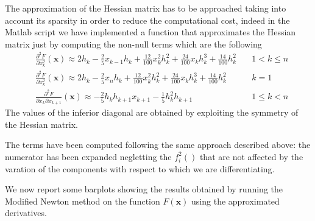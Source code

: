 The approximation of the Hessian matrix has to be approached taking into account its sparsity in order to reduce the computational cost, indeed in the Matlab script we have implemented a function that approximates the Hessian matrix just by computing the non-null terms which are the following
\begin{align*}
    & \frac{\partial^2 F}{\partial x_k^2} (\mathbf{x})  \approx 2h_k - \frac{2}{5} x_{k-1} h_k + \frac{12}{100} x_k^2 h_k^2 + \frac{24}{100}x_k h_k^3 + \frac{14}{100} h_k^2 \quad & 1 < k \leq n \\
    & \frac{\partial^2 F}{\partial x_k^2} (\mathbf{x})  \approx 2h_k - \frac{2}{5} x_{n} h_k + \frac{12}{100} x_k^2 h_k^2 + \frac{24}{100}x_k h_k^3 + \frac{14}{100} h_k^2 \quad  & k = 1 \\
    & \frac{\partial^2 F}{\partial x_k \partial x_{k+1}} (\mathbf{x})  \approx - \frac{2}{5} h_k h_{k+1} x_{k+1} - \frac{1}{5} h_k^2 h_{k+1} \quad & 1 \leq k < n 
\end{align*}
The values of the inferior diagonal are obtained by exploiting the symmetry of the Hessian matrix.

The terms have been computed following the same approach described above: the numerator has been expanded negletting the $f_i^2()$ that are not affected by the varation of the components with respect to which we are differentiating.


We now report some barplots showing the results obtained by running the Modified Newton method on the function $F(\mathbf{x})$ using the approximated derivatives.

